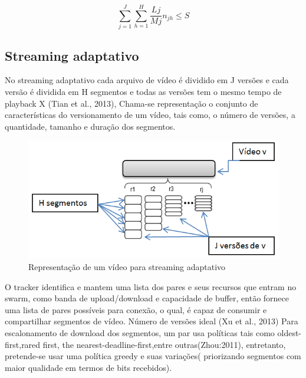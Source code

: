 \documentclass[
	12pt,				%
	oneside,			%
	a4paper,			%
	english,			%
	brazil				%
	]{abntex2ppgsi}
\begin{document}
\begin{equation}
  \sum_{j=1}^{J}\sum_{h=1}^{H}\frac{Lj}{Mj}n_{jh}\leq S
	\label{eq:equacao-exemplo4}
\end{equation}


\subsection{Streaming adaptativo}

No streaming adaptativo cada arquivo de vídeo é dividido em J versões e cada versão é dividida em H segmentos e todas as versões tem o mesmo tempo de playback X (Tian et al., 2013), Chama-se representação o conjunto de características do versionamento de um vídeo, tais como, o número de versões, a quantidade, tamanho e duração dos segmentos.


\begin{figure}[H]%
	\centering
 	  \caption{Representação de um vídeo para streaming adaptativo}
		\includegraphics{figuras/segmentos.png}
\end{figure}

O tracker identifica e mantem uma lista dos pares e seus recursos que entram no swarm, como banda de upload/download e capacidade de buffer, então fornece uma lista de pares possíveis para conexão, o qual, é capaz de consumir e compartilhar segmentos de vídeo.
Número de versões ideal (Xu et al., 2013)
Para escalonamento de download dos segmentos, um par usa políticas tais como oldest-first,rared first, the nearest-deadline-first,entre outras(Zhou:2011), entretanto, pretende-se usar uma política greedy e suas variações( priorizando segmentos com maior qualidade em termos de bits recebidos).
\end{document}
